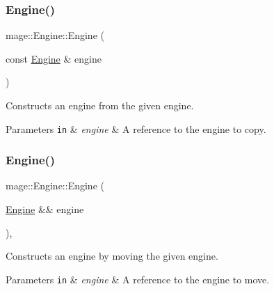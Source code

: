 \subsubsection{\texorpdfstring{Engine()}{Engine()}\hspace{0.1cm}{\footnotesize\ttfamily [2/3]}}
{\footnotesize\ttfamily mage\+::\+Engine\+::\+Engine (\begin{DoxyParamCaption}\item[{const \hyperlink{classmage_1_1_engine}{Engine} \&}]{engine }\end{DoxyParamCaption})\hspace{0.3cm}{\ttfamily [delete]}}

Constructs an engine from the given engine.


\begin{DoxyParams}[1]{Parameters}
\mbox{\tt in}  & {\em engine} & A reference to the engine to copy. \\
\hline
\end{DoxyParams}
\hypertarget{classmage_1_1_engine_a91a51a60109b49d6e322c299147e1312}{}\label{classmage_1_1_engine_a91a51a60109b49d6e322c299147e1312} 
\subsubsection{\texorpdfstring{Engine()}{Engine()}\hspace{0.1cm}{\footnotesize\ttfamily [3/3]}}
{\footnotesize\ttfamily mage\+::\+Engine\+::\+Engine (\begin{DoxyParamCaption}\item[{\hyperlink{classmage_1_1_engine}{Engine} \&\&}]{engine }\end{DoxyParamCaption})\hspace{0.3cm}{\ttfamily [default]}, {\ttfamily [noexcept]}}

Constructs an engine by moving the given engine.


\begin{DoxyParams}[1]{Parameters}
\mbox{\tt in}  & {\em engine} & A reference to the engine to move. \\
\hline
\end{DoxyParams}
\hypertarget{classmage_1_1_engine_a34628556f8397d70ed018d71e343c2f5}{}\label{classmage_1_1_engine_a34628556f8397d70ed018d71e343c2f5} 
